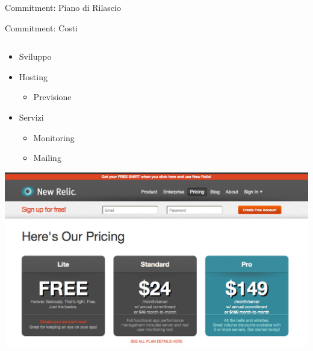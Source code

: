 \begin{frame}{Commitment: Piano di Rilascio}
		\vspace*{1cm}
		{\footnotesize {}}

	\end{frame}
	
	\begin{frame}{Commitment: Costi}
		
		\begin{columns}[T]
		    \begin{column}{.5\textwidth}
			
				\begin{itemize}
					\item Sviluppo
					\item Hosting
						\begin{itemize}
							\item Previsione
						\end{itemize}
					\item Servizi
					\begin{itemize}
						\item Monitoring
						\item Mailing
					\end{itemize}
				\end{itemize}
				
				\vspace*{0.2cm}
				\hspace*{0.5cm} \includegraphics[scale=0.14]{images/costs-3}
    		\end{column}


\end{columns}
\end{frame}
